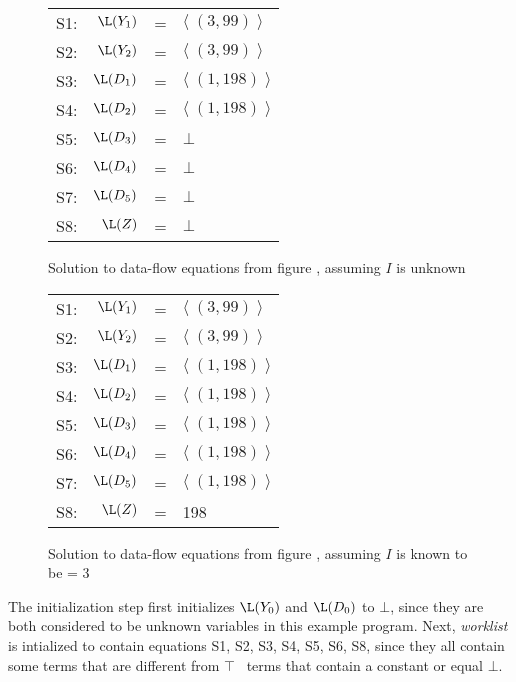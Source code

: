 \begin{figure}
\begin{center}
\begin{tabular}{r r c l}
\mbox{S1:} & $\L(Y_1)$ & = & $\langle \; (3,99)\; \rangle$ \\
\mbox{S2:} & $\L(Y_2)$ & = & $\langle \; (3,99)\; \rangle$ \\
\mbox{S3:} & $\L(D_1)$ & = & $\langle \; (1,198)\; \rangle$ \\
\mbox{S4:} & $\L(D_2)$ & = & $\langle \; (1,198)\; \rangle$ \\
\mbox{S5:} & $\L(D_3)$ & = & $\bot$\\
\mbox{S6:} & $\L(D_4)$ & = & $\bot$\\
\mbox{S7:} & $\L(D_5)$ & = & $\bot$\\
\mbox{S8:} & $\L(Z)$ & =  & $\bot$
\end{tabular}
\end{center}
\caption{Solution to data-flow equations from figure \protect{\ref{fig:sc-ex-df}}, assuming $I$ is unknown}
\label{fig:sc-ex-sol1}
\end{figure}

\begin{figure}
\begin{center}
\begin{tabular}{r r c l}
\mbox{S1:} & $\L(Y_1)$ & = & $\langle \; (3,99)\; \rangle$ \\
\mbox{S2:} & $\L(Y_2)$ & = & $\langle \; (3,99)\; \rangle$ \\
\mbox{S3:} & $\L(D_1)$ & = & $\langle \; (1,198)\; \rangle$ \\
\mbox{S4:} & $\L(D_2)$ & = & $\langle \; (1,198)\; \rangle$ \\
\mbox{S5:} & $\L(D_3)$ & = & $\langle \; (1,198)\; \rangle$ \\
\mbox{S6:} & $\L(D_4)$ & = & $\langle \; (1,198)\; \rangle$ \\
\mbox{S7:} & $\L(D_5)$ & = & $\langle \; (1,198)\; \rangle$ \\
\mbox{S8:} & $\L(Z)$ & =  & 198
\end{tabular}
\end{center}
\caption{Solution to data-flow equations from figure \protect{\ref{fig:sc-ex-df}}, assuming $I$ is known to be = 3}
\label{fig:sc-ex-sol2}
\end{figure}

The initialization step first initializes $\L(Y_0)$
and $\L(D_0)$ to $\bot$, since they are both considered to be unknown
variables in this example program.  Next, {\it worklist} is intialized
to contain equations S1, S2, S3, S4, S5, S6, S8, since they all
contain some terms that are different from $\top$ \ie\ terms that
contain a constant or equal $\bot$.

